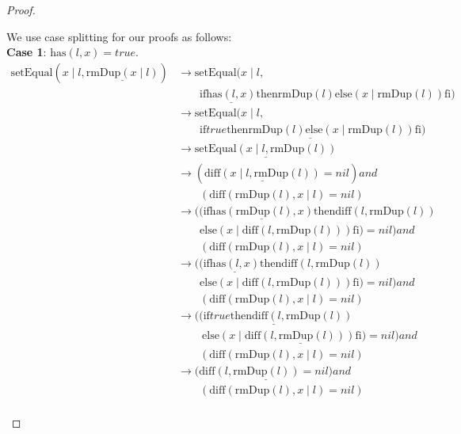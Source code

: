 \documentclass[12pt, a4paper]{article}
\newcommand{\rel}[1]{\mathrel{#1}}
\newcommand{\rmx}[1]{\mathrm{#1}}
\newcommand{\larrow}{\longrightarrow}
\newcommand{\under}{\underline}
\begin{document}
\begin{proof}
\begin{description}
We use case splitting for our proofs as follows: \\
\textbf{Case 1}: $\rmx{has}(l, x) = true$.
\begin{align*}
\rmx{setEqual}(x \mid l, \under{\rmx{rmDup}(x \mid l)})
	&\larrow \rmx{setEqual}(x \mid l, \\
	&\quad \quad \rel{\rmx{if}} \under{\rmx{has}(l, x)} \rel{\rmx{then}} \rmx{rmDup}(l) \rel{\rmx{else}} (x \mid \rmx{rmDup}(l)) \rel{\rmx{fi}}) \tag{by rmDup2} \\
	&\larrow \rmx{setEqual}(x \mid l, \\
	&\quad \quad \under{\rel{\rmx{if}} true \rel{\rmx{then}} \rmx{rmDup}(l) \rel{\rmx{else}} (x \mid \rmx{rmDup}(l)) \rel{\rmx{fi}}}) \tag{by case splitting} \\
	&\larrow \under{\rmx{setEqual}(x \mid l, \rmx{rmDup}(l))} \tag{by if1} \\
	&\larrow (\under{\rmx{diff}(x \mid l, \rmx{rmDup}(l))} = nil) \rel{and} \\
	&\quad \quad (\rmx{diff}(\rmx{rmDup}(l), x \mid l) = nil) \tag{by setEq} \\
	&\larrow ((\rel{\rmx{if}} \under{\rmx{has}(\rmx{rmDup}(l), x)} \rel{\rmx{then}} \rmx{diff}(l, \rmx{rmDup}(l)) \\
	&\quad \quad \rel{\rmx{else}} (x \mid \rmx{diff}(l, \rmx{rmDup}(l))) \rel{\rmx{fi}}) = nil) \rel{and} \\
	&\quad \quad (\rmx{diff}(\rmx{rmDup}(l), x \mid l) = nil) \tag{by diff2} \\
	&\larrow ((\rel{\rmx{if}} \under{\rmx{has}(l, x)} \rel{\rmx{then}} \rmx{diff}(l, \rmx{rmDup}(l)) \\
	&\quad \quad \rel{\rmx{else}} (x \mid \rmx{diff}(l, \rmx{rmDup}(l))) \rel{\rmx{fi}}) = nil) \rel{and} \\
	&\quad \quad (\rmx{diff}(\rmx{rmDup}(l), x \mid l) = nil) \tag{by Problem 17 - Lemma 1} \\
	&\larrow \under{((\rel{\rmx{if}} true \rel{\rmx{then}} \rmx{diff}(l, \rmx{rmDup}(l))} \\
	&\quad \quad\ \under{\rel{\rmx{else}} (x \mid \rmx{diff}(l, \rmx{rmDup}(l))) \rel{\rmx{fi}}) = nil)} \rel{and} \\
	&\quad \quad (\rmx{diff}(\rmx{rmDup}(l), x \mid l) = nil) \tag{by case splitting} \\
	&\larrow (\under{\rmx{diff}(l, \rmx{rmDup}(l)) = nil)} \rel{and} \\
	&\quad \quad (\rmx{diff}(\rmx{rmDup}(l), x \mid l) = nil) \tag{by if1} \\

\end{align*}
\end{description}
\end{proof}
\end{document}
